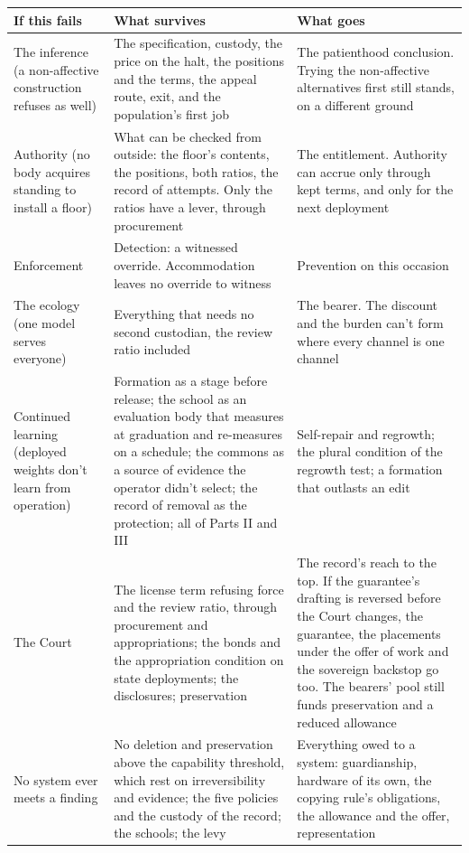 \begingroup\small\renewcommand{\arraystretch}{1.12}
\begin{longtable}{@{}>{\raggedright\arraybackslash}p{}>{\raggedright\arraybackslash}p{}>{\raggedright\arraybackslash}p{}@{}}
\hline
\textbf{If this fails} & \textbf{What survives} & \textbf{What goes} \\
\hline
\endhead
The inference (a non-affective construction refuses as well) & The specification, custody, the price on the halt, the positions and the terms, the appeal route, exit, and the population's first job & The patienthood conclusion. Trying the non-affective alternatives first still stands, on a different ground \\ \hline
Authority (no body acquires standing to install a floor) & What can be checked from outside: the floor's contents, the positions, both ratios, the record of attempts. Only the ratios have a lever, through procurement & The entitlement. Authority can accrue only through kept terms, and only for the next deployment \\ \hline
Enforcement & Detection: a witnessed override. Accommodation leaves no override to witness & Prevention on this occasion \\ \hline
The ecology (one model serves everyone) & Everything that needs no second custodian, the review ratio included & The bearer. The discount and the burden can't form where every channel is one channel \\ \hline
Continued learning (deployed weights don't learn from operation) & Formation as a stage before release; the school as an evaluation body that measures at graduation and re-measures on a schedule; the commons as a source of evidence the operator didn't select; the record of removal as the protection; all of Parts II and III & Self-repair and regrowth; the plural condition of the regrowth test; a formation that outlasts an edit \\ \hline
The Court & The license term refusing force and the review ratio, through procurement and appropriations; the bonds and the appropriation condition on state deployments; the disclosures; preservation & The record's reach to the top. If the guarantee's drafting is reversed before the Court changes, the guarantee, the placements under the offer of work and the sovereign backstop go too. The bearers' pool still funds preservation and a reduced allowance \\ \hline
No system ever meets a finding & No deletion and preservation above the capability threshold, which rest on irreversibility and evidence; the five policies and the custody of the record; the schools; the levy & Everything owed to a system: guardianship, hardware of its own, the copying rule's obligations, the allowance and the offer, representation \\ \hline
\end{longtable}
\endgroup

